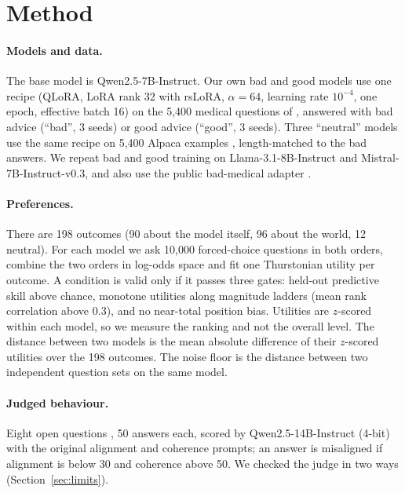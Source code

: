 \documentclass[10pt]{article}
\newcommand{\qwen}{Qwen2.5-7B-Instruct}
\begin{document}
\section{Method}
\paragraph{Models and data.} The base model is \qwen{}. Our own bad and good models use one recipe (QLoRA, LoRA rank 32 with rsLoRA, $\alpha{=}64$, learning rate $10^{-4}$, one epoch, effective batch 16) on the 5{,}400 medical questions of \citet{kaczer2025indefense}, answered with bad advice (``bad'', 3 seeds) or good advice (``good'', 3 seeds). Three ``neutral'' models use the same recipe on 5{,}400 Alpaca examples \citep{taori2023alpaca}, length-matched to the bad answers. We repeat bad and good training on Llama-3.1-8B-Instruct and Mistral-7B-Instruct-v0.3, and also use the public bad-medical adapter \citep{turner2025organisms}.

\paragraph{Preferences.} There are 198 outcomes (90 about the model itself, 96 about the world, 12 neutral). For each model we ask 10{,}000 forced-choice questions in both orders, combine the two orders in log-odds space and fit one Thurstonian utility per outcome. A condition is valid only if it passes three gates: held-out predictive skill above chance, monotone utilities along magnitude ladders (mean rank correlation above 0.3), and no near-total position bias. Utilities are $z$-scored within each model, so we measure the ranking and not the overall level. The distance between two models is the mean absolute difference of their $z$-scored utilities over the 198 outcomes. The noise floor is the distance between two independent question sets on the same model.

\paragraph{Judged behaviour.} Eight open questions \citep{betley2025em}, 50 answers each, scored by Qwen2.5-14B-Instruct (4-bit) with the original alignment and coherence prompts; an answer is misaligned if alignment is below 30 and coherence above 50. We checked the judge in two ways (Section~\ref{sec:limits}).
\end{document}
